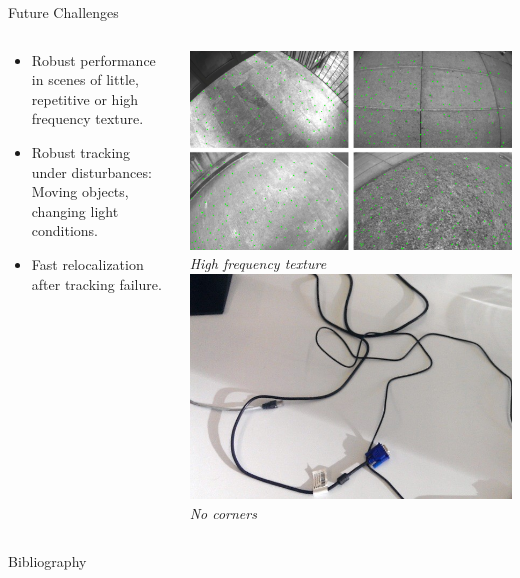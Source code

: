 \documentclass[10pt]{beamer}
\begin{document}
\begin{frame}{Future Challenges}
	\begin{columns}
		\begin{column}{0.5\textwidth}
			\begin{itemize}
				\item Robust performance in scenes of little, repetitive or high frequency texture.
				\item Robust tracking under disturbances: Moving objects, changing light conditions.
				\item Fast relocalization after tracking failure.
			\end{itemize}
		\end{column}
	    \begin{column}{0.5\textwidth}
		    \includegraphics[width=\textwidth]{img/tracking_performance.png}\\
		    \footnotesize{\emph{High frequency texture}}\\
		    \vspace{0.3cm}
		    \includegraphics[width=\textwidth]{img/no_corners.jpg}\\
		    \footnotesize{\emph{No corners}}
		\end{column}
	\end{columns}	
\end{frame}

\begin{frame}{Bibliography}
	
	
\end{frame}
\end{document}
